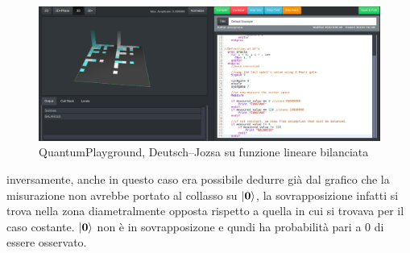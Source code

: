 \documentclass[12pt,a4paper,openright]{report}
\begin{document}
\begin{figure}[h]
    \centering
    \includegraphics[width=\textwidth,height=\textheight,keepaspectratio]{LinearBalancedFunction}
    \caption{QuantumPlayground, Deutsch–Jozsa su funzione lineare bilanciata}
\end{figure}

inversamente, anche in questo caso era possibile dedurre già dal grafico che la misurazione non avrebbe portato al collasso 
su $\ket{\textbf{0}}$, la sovrapposizione infatti si trova nella zona diametralmente opposta rispetto a quella in cui si trovava per il
caso costante. $\ket{\textbf{0}}$ non è in sovrapposizone e qundi ha probabilità pari a 0 di essere osservato.\par
\end{document}
